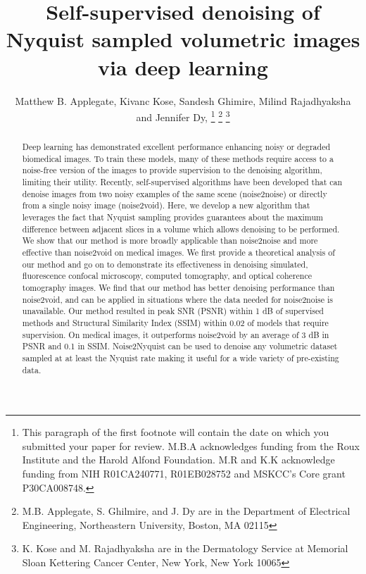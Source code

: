 \documentclass[journal,twoside,web]{ieeecolor}
\begin{document}
\title{Self-supervised denoising of Nyquist sampled volumetric images via deep learning}
\author{Matthew B. Applegate, Kivanc Kose, Sandesh Ghimire, Milind Rajadhyaksha and Jennifer Dy, 
\thanks{This paragraph of the first footnote will contain the date on which
you submitted your paper for review. M.B.A acknowledges funding from the Roux Institute and the Harold Alfond Foundation. M.R and K.K acknowledge funding from NIH R01CA240771, R01EB028752 and MSKCC’s Core grant P30CA008748.}
\thanks{M.B. Applegate, S. Ghilmire, and J. Dy are in the Department of Electrical Engineering, Northeastern University, Boston, MA 02115}
\thanks{K. Kose and M. Rajadhyaksha are in the Dermatology Service at Memorial Sloan Kettering Cancer Center, New York, New York 10065}}

\maketitle

\begin{abstract}
Deep learning has demonstrated excellent performance enhancing noisy or degraded biomedical images. To train these models, many of these methods require access to a noise-free version of the images to provide supervision to the denoising algorithm, limiting their utility. Recently, self-supervised algorithms have been developed that can denoise images from two noisy examples of the same scene (noise2noise) or directly from a single noisy image (noise2void). Here, we develop a new algorithm that leverages the fact that Nyquist sampling provides guarantees about the maximum difference between adjacent slices in a volume which allows denoising to be performed. We show that our method is more broadly applicable than noise2noise and more effective than noise2void on medical images. We first provide a theoretical analysis of our method and go on to demonstrate its effectiveness in denoising simulated, fluorescence confocal microscopy, computed tomography, and optical coherence tomography images. We find that our method has better denoising performance than noise2void, and can be applied in situations where the data needed for noise2noise is unavailable. Our method resulted in peak SNR (PSNR) within 1 dB of supervised methods and Structural Similarity Index (SSIM) within 0.02 of models that require supervision. On medical images, it outperforms noise2void by an average of 3 dB in PSNR and 0.1 in SSIM. Noise2Nyquist can be used to denoise any volumetric dataset sampled at at least the Nyquist rate making it useful for a wide variety of pre-existing data.
\end{abstract}
\end{document}
